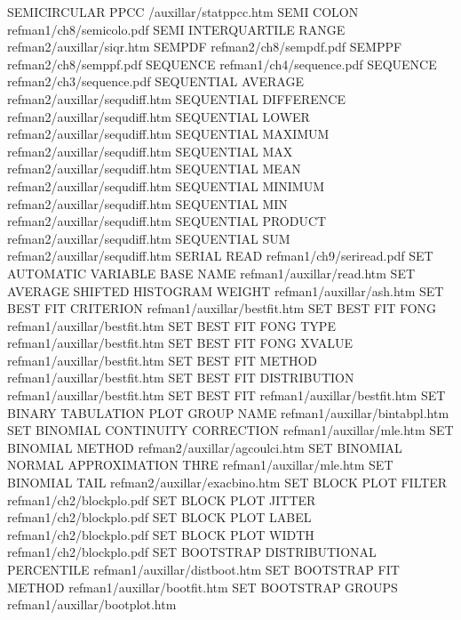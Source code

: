 SEMICIRCULAR PPCC                       /auxillar/statppcc.htm
SEMI COLON                              refman1/ch8/semicolo.pdf
SEMI INTERQUARTILE RANGE                refman2/auxillar/siqr.htm
SEMPDF                                  refman2/ch8/sempdf.pdf
SEMPPF                                  refman2/ch8/semppf.pdf
SEQUENCE                                refman1/ch4/sequence.pdf
SEQUENCE                                refman2/ch3/sequence.pdf
SEQUENTIAL AVERAGE                      refman2/auxillar/sequdiff.htm
SEQUENTIAL DIFFERENCE                   refman2/auxillar/sequdiff.htm
SEQUENTIAL LOWER                        refman2/auxillar/sequdiff.htm
SEQUENTIAL MAXIMUM                      refman2/auxillar/sequdiff.htm
SEQUENTIAL MAX                          refman2/auxillar/sequdiff.htm
SEQUENTIAL MEAN                         refman2/auxillar/sequdiff.htm
SEQUENTIAL MINIMUM                      refman2/auxillar/sequdiff.htm
SEQUENTIAL MIN                          refman2/auxillar/sequdiff.htm
SEQUENTIAL PRODUCT                      refman2/auxillar/sequdiff.htm
SEQUENTIAL SUM                          refman2/auxillar/sequdiff.htm
SERIAL READ                             refman1/ch9/seriread.pdf
SET AUTOMATIC VARIABLE BASE NAME        refman1/auxillar/read.htm
SET AVERAGE SHIFTED HISTOGRAM WEIGHT    refman1/auxillar/ash.htm
SET BEST FIT CRITERION                  refman1/auxillar/bestfit.htm
SET BEST FIT FONG                       refman1/auxillar/bestfit.htm
SET BEST FIT FONG TYPE                  refman1/auxillar/bestfit.htm
SET BEST FIT FONG XVALUE                refman1/auxillar/bestfit.htm
SET BEST FIT METHOD                     refman1/auxillar/bestfit.htm
SET BEST FIT DISTRIBUTION               refman1/auxillar/bestfit.htm
SET BEST FIT                            refman1/auxillar/bestfit.htm
SET BINARY TABULATION PLOT GROUP NAME   refman1/auxillar/bintabpl.htm
SET BINOMIAL CONTINUITY CORRECTION      refman1/auxillar/mle.htm
SET BINOMIAL METHOD                     refman2/auxillar/agcoulci.htm
SET BINOMIAL NORMAL APPROXIMATION THRE  refman1/auxillar/mle.htm
SET BINOMIAL TAIL                       refman2/auxillar/exacbino.htm
SET BLOCK PLOT FILTER                   refman1/ch2/blockplo.pdf
SET BLOCK PLOT JITTER                   refman1/ch2/blockplo.pdf
SET BLOCK PLOT LABEL                    refman1/ch2/blockplo.pdf
SET BLOCK PLOT WIDTH                    refman1/ch2/blockplo.pdf
SET BOOTSTRAP DISTRIBUTIONAL PERCENTILE refman1/auxillar/distboot.htm
SET BOOTSTRAP FIT METHOD                refman1/auxillar/bootfit.htm
SET BOOTSTRAP GROUPS                    refman1/auxillar/bootplot.htm
